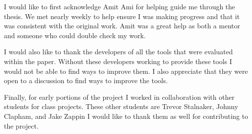 \begin{large}
\begin{flushleft}
\noindent I would like to first acknowledge Amit Ami for helping guide me through the thesis. We met nearly weekly to help ensure I was making progress and that it was consistent with the original work. Amit was a great help as both a mentor and someone who could double check my work. \\
\end{flushleft}

\begin{flushleft}
\noindent I would also like to thank the developers of all the tools that were evaluated within the paper. Without these developers working to provide these tools I would not be able to find ways to improve them. I also appreciate that they were open to a discussion to find ways to improve the tools.\\
\end{flushleft}

\begin{flushleft}
\noindent Finally, for early portions of the project I worked in collaboration with other students for class projects. These other students are Trevor Stalnaker, Johnny Clapham, and Jake Zappin I would like to thank them as well for contributing to the project.\\
\end{flushleft}


\end{large}